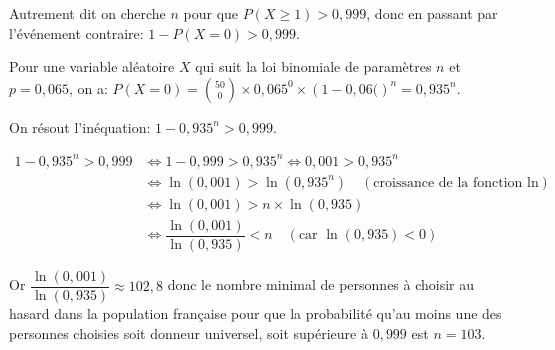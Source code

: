 \begin{enumerate}
Autrement dit on cherche $n$ pour que $P\left (X\geqslant 1\right ) > 0,999$, donc en passant par l'événement contraire: $1-P\left (X=0\right ) > 0,999$.

Pour une variable aléatoire $X$ qui suit la loi binomiale de paramètres $n$ et $p=0,065$, on a: $P\left (X=0\right ) = \displaystyle\binom{50}{0} \times 0,065^0 \times \left (1-0,06(\right )^{n}=0,935^n$.

On résout l'inéquation: $1-0,935^n > 0,999$.

$\begin{aligned}
1-0,935^n > 0,999
& \iff 1-0,999 > 0,935^n \iff 0,001 > 0,935^n\\
& \iff \ln \left ( 0,001\right ) > \ln \left ( 0,935^n\right ) \quad (\text{croissance de la fonction ln})\\
& \iff \ln \left ( 0,001\right ) > n\times \ln \left ( 0,935\right )\\
& \iff \dfrac{\ln \left ( 0,001\right )}{\ln \left ( 0,935\right )} < n \quad (\text{car }\ln\left (0,935\right )<0)
\end{aligned}$

Or $\dfrac{\ln \left ( 0,001\right )}{\ln \left ( 0,935\right )} \approx 102,8$ donc  le nombre minimal de personnes à choisir au hasard dans la population française pour que la probabilité qu'au moins une des personnes choisies soit donneur universel, soit supérieure à $0,999$ est $n=103$.
\end{enumerate}

\bigskip
